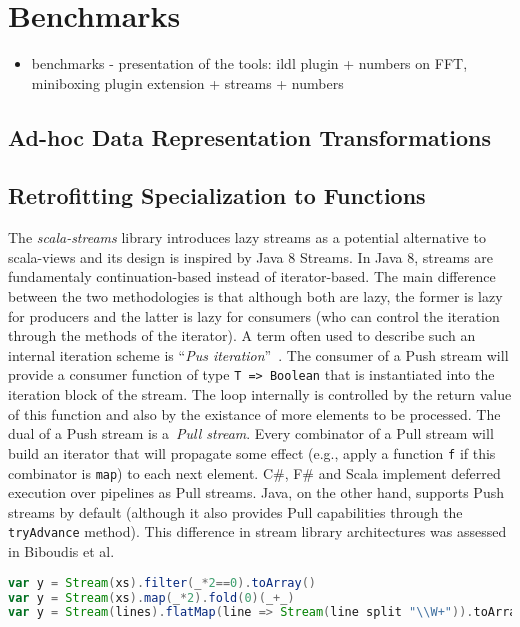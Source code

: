 \section{Benchmarks}
\label{sec:benchmarks}
\begin{itemize}
  \item benchmarks - presentation of the tools: ildl plugin + numbers on FFT, miniboxing plugin extension + streams + numbers
\end{itemize}

\subsection{Ad-hoc Data Representation Transformations}
\label{sec:benchmarks:ad-hoc}

\subsection{Retrofitting Specialization to Functions}

\label{sec:benchmarks:funcs}
The \emph{scala-streams} library introduces lazy streams as a potential
alternative to scala-views and its design is inspired by Java 8 Streams. In Java
8, streams are fundamentaly continuation-based instead of iterator-based. The
main difference between the two methodologies is that although both are lazy,
the former is lazy for producers and the latter is lazy for consumers (who can
control the iteration through the methods of the iterator). A term often used to
describe such an internal iteration scheme is ``\emph{Pus
  iteration}''~\cite{obsidian,defuncpush}.  The consumer of a Push stream will
provide a consumer function of type \verb|T => Boolean| that is instantiated
into the iteration block of the stream. The loop internally is controlled by the
return value of this function and also by the existance of more elements to be
processed. The dual of a Push stream is a~\emph{Pull stream}. Every combinator
of a Pull stream will build an iterator that will propagate some effect (e.g.,
apply a function \verb|f| if this combinator is \verb|map|) to each next
element. C\#, F\# and Scala implement deferred execution over pipelines as Pull
streams. Java, on the other hand, supports Push streams by default (although it
also provides Pull capabilities through the \verb|tryAdvance| method). This
difference in stream library architectures was assessed in Biboudis et al.~\cite{}

\begin{lstlisting}[language=Scala]
var y = Stream(xs).filter(_*2==0).toArray()
var y = Stream(xs).map(_*2).fold(0)(_+_)
var y = Stream(lines).flatMap(line => Stream(line split "\\W+")).toArray
\end{lstlisting}

